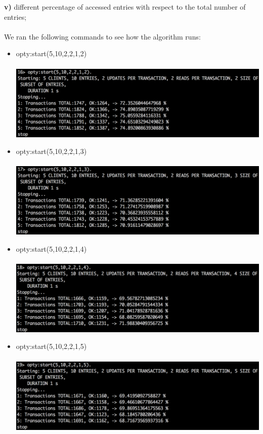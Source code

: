 \documentclass[a4paper, 11pt]{article}
\begin{document}
\textbf{v)} different percentage of accessed entries with respect to the total number of entries;\\\\

We ran the following commands to see how the algorithm runs:\\

\begin{itemize}
\item opty:start(5,10,2,2,1,2)\\\\
\includegraphics[scale=0.5]{images/exp-v-1.png} \\
\item opty:start(5,10,2,2,1,3)\\\\
\includegraphics[scale=0.5]{images/exp-v-2.png} \\
\newpage
\item opty:start(5,10,2,2,1,4)\\\\
\includegraphics[scale=0.5]{images/exp-v-3.png} \\
\item opty:start(5,10,2,2,1,5)\\\\
\includegraphics[scale=0.5]{images/exp-v-4.png} \\

\end{itemize}
\end{document}
